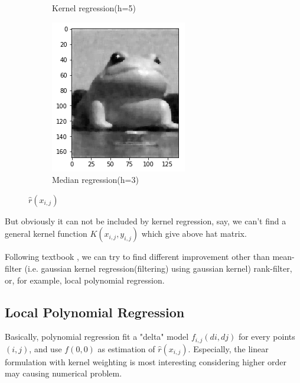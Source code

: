 \documentclass{article}
\begin{document}
\begin{figure}[htb]
\begin{subfigure}[b]{0.24\linewidth}
    \caption{Kernel regression(h=5)}
  \end{subfigure}
  \begin{subfigure}[b]{0.24\linewidth}
    \includegraphics[width=\linewidth]{images/noise_removal_4.png}
    \caption{Median regression(h=3)}
  \end{subfigure}
  \caption{$\hat{r}(x_{i,j})$}
  \label{fig:effect_noise_removal}
\end{figure}

But obviously it can not be included by kernel regression, say, 
we can't find a general kernel function $K(x_{i,j},y_{i,j})$ which give above hat matrix. 

Following textbook \cite{wasserman2006all}, we can try to find different improvement other than mean-filter 
(i.e. gaussian kernel regression(filtering) using gaussian kernel) rank-filter, or, 
for example, local polynomial regression. 


\subsection{Local Polynomial Regression}

Basically, polynomial regression fit a "delta" model $f_{i,j}(di,dj)$ for every points $(i,j)$, and use $f(0,0)$
as estimation of $\hat{r}(x_{i,j})$. Especially, the linear formulation with kernel weighting is most 
interesting considering higher order may causing numerical problem.
\end{document}
